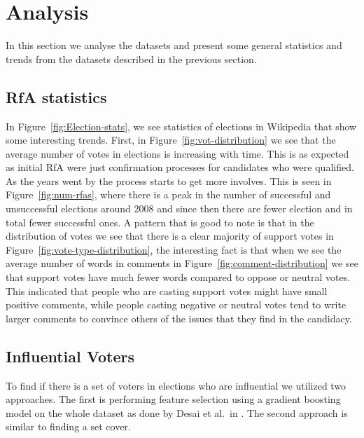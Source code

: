 \section{Analysis}
In this section we analyse the datasets and present some general statistics and trends from the datasets described in the previous section.

\subsection{RfA statistics}
In Figure~\ref{fig:Election-stats}, we see statistics of elections in Wikipedia that show some interesting trends. First, in Figure~\ref{fig:vot-distribution} we see that the average number of votes in elections is increasing with time. This is as expected as initial RfA were just confirmation processes for candidates who were qualified. As the years went by the process starts to get more involves. This is seen in Figure~\ref{fig:num-rfas}, where there is a peak in the number of successful and unsuccessful elections around 2008 and since then there are fewer election and in total fewer successful ones. A pattern that is good to note is that in the distribution of votes we see that there is a clear majority of support votes in Figure~\ref{fig:vote-type-distribution}, the interesting fact is that when we see the average number of words in comments in Figure~\ref{fig:comment-distribution} we see that support votes have much fewer words compared to oppose or neutral votes. This indicated that people who are casting support votes might have small positive comments, while people casting negative or neutral votes tend to write larger comments to convince others of the issues that they find in the candidacy.

\subsection{Influential Voters}
\label{sec:influential-voters}
To find if there is a set of voters in elections who are influential we utilized two approaches. The first is performing feature selection using a gradient boosting model on the whole dataset as done by Desai et al.\ in \cite{desai2014result}. The second approach is similar to finding a set cover.

